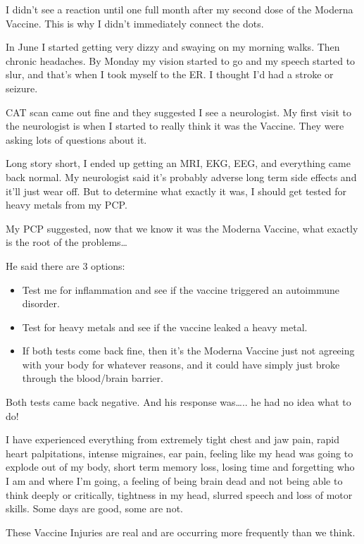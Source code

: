 I didn’t see a reaction until one full month after my second dose of the Moderna
Vaccine. This is why I didn’t immediately connect the dots.

In June I started getting very dizzy and swaying on my morning walks. Then
chronic headaches. By Monday my vision started to go and my speech started to
slur, and that’s when I took myself to the ER. I thought I’d had a stroke or
seizure.

CAT scan came out fine and they suggested I see a neurologist. My first visit to
the neurologist is when I started to really think it was the Vaccine. They were
asking lots of questions about it.

Long story short, I ended up getting an MRI, EKG, EEG, and everything came back
normal. My neurologist said it’s probably adverse long term side effects and
it’ll just wear off. But to determine what exactly it was, I should get tested
for heavy metals from my PCP.

My PCP suggested, now that we know it was the Moderna Vaccine, what exactly is
the root of the problems…

He said there are 3 options:

\begin{itemize}

\item Test me for inflammation and see if the vaccine triggered an autoimmune
  disorder.
  
\item Test for heavy metals and see if the vaccine leaked a heavy metal.

\item If both tests come back fine, then it’s the Moderna Vaccine just not
  agreeing with your body for whatever reasons, and it could have simply just
  broke through the blood/brain barrier.
  
\end{itemize}

Both tests came back negative. And his response was….. he had no idea what to
do!

I have experienced everything from extremely tight chest and jaw pain, rapid
heart palpitations, intense migraines, ear pain, feeling like my head was going
to explode out of my body, short term memory loss, losing time and forgetting
who I am and where I’m going, a feeling of being brain dead and not being able
to think deeply or critically, tightness in my head, slurred speech and loss of
motor skills. Some days are good, some are not.

These Vaccine Injuries are real and are occurring more frequently than we think.
